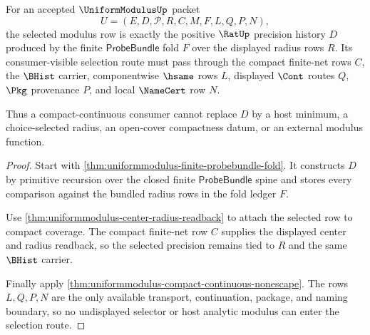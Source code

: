 \begin{theorem}
\label{thm:uniformmodulus-modulus-selection-obligation}
For an accepted $\UniformModulusUp$ packet
$$
U=(E,D,\mathcal{P},R,C,M,F,L,Q,P,N),
$$
the selected modulus row is exactly the positive $\RatUp$ precision history $D$ produced by the finite $\mathsf{ProbeBundle}$ fold $F$ over the displayed radius rows $R$. Its consumer-visible selection route must pass through the compact finite-net rows $C$, the $\BHist$ carrier, componentwise $\hsame$ rows $L$, displayed $\Cont$ routes $Q$, $\Pkg$ provenance $P$, and local $\NameCert$ row $N$.

Thus a compact-continuous consumer cannot replace $D$ by a host minimum, a choice-selected radius, an open-cover compactness datum, or an external modulus function.
\end{theorem}
\begin{proof}
Start with \autoref{thm:uniformmodulus-finite-probebundle-fold}. It constructs $D$ by primitive recursion over the closed finite $\mathsf{ProbeBundle}$ spine and stores every comparison against the bundled radius rows in the fold ledger $F$.

Use \autoref{thm:uniformmodulus-center-radius-readback} to attach the selected row to compact coverage. The compact finite-net row $C$ supplies the displayed center and radius readback, so the selected precision remains tied to $R$ and the same $\BHist$ carrier.

Finally apply \autoref{thm:uniformmodulus-compact-continuous-nonescape}. The rows $L,Q,P,N$ are the only available transport, continuation, package, and naming boundary, so no undisplayed selector or host analytic modulus can enter the selection route.
\end{proof}

